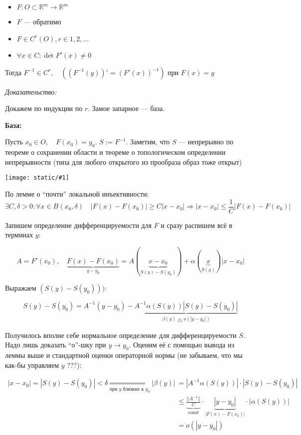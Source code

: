 \documentclass{article}
\def\image#1{\texttt{[image: static/\#1]}}
\DeclareMathOperator{\const}{const}
\begin{document}
\begin{itemize}
    \item $F: O \subset \mathbb{R}^m \rightarrow \mathbb{R}^m$
    \item $F$ --- обратимо
    \item $F \in C^r(O), r \in 1, 2, \ldots$
    \item $\forall x \in C: \det F'(x) \neq 0$
\end{itemize}

Тогда $F^{-1} \in C^r, \quad ((F^{-1}(y))' = (F'(x))^{-1})$ при $F(x) = y$

\textit{Доказательство:}

Докажем по индукции по $r$. Замое запарное --- база.

\textbf{База:}

Пусть $x_0 \in O, \quad F(x_0) = y_0$. $S := F^{-1}$. Заметим, что $S$ --- непрерывно по теореме о сохранении области и теореме о топологическом определении непрерывности (типа для любого открытого из прообраза образ тоже открыт)

\image{glad_obr.png}

По лемме о ``почти'' локальной инъективности:
\[\exists C, \delta > 0: \forall x \in B(x_0, \delta) \quad |F(x) - F(x_0)| \ge C|x - x_0| \Rightarrow |x - x_0| \le \frac{1}{C}|F(x) - F(x_0)|\]

Запишем определение дифференцируемости для $F$ и сразу распишем всё в терминах $y$:

\[A = F'(x_0), \quad \underbrace{F(x) - F(x_0)}_{y - y_0} = A(\underbrace{x - x_0}_{S(y) - S(y_0)}) + \alpha(\underbrace{x}_{S(y)})|x - x_0|\]

Выражаем $(S(y) - S(y_0)))$:

\[S(y) - S(y_0) = A^{-1}(y - y_0) - \underbrace{A^{-1}\alpha(S(y))|S(y) - S(y_0)|}_{\beta(y) \underset{???}{=} o(|y - y_0|)}\]

Получилось вполне себе нормальное определение для дифференцируемости $S$. Надо лишь доказать ``о''-шку при $y \rightarrow y_0$. Оценим её с помощью вывода из леммы выше и стандартной оценки операторной нормы (не забываем, что мы как-бы управляем $y$ ???):

\begin{align*}
    |x - x_0| = |S(y) - S(y_0)| < \delta \underset{\text{при }y\text{ близких к }y_0}{\Rightarrow} |\beta(y)| &= |A^{-1}\alpha(S(y))|\cdot|S(y) - S(y_0)| \\
    &\le \underbrace{\frac{||A^{-1}||}{C}}_{\const}\cdot\underbrace{|y - y_0|}_{|F(x) - F(x_0)|}\cdot|\alpha(S(y))| \\
    &= o(|y - y_0|)
\end{align*}
\end{document}

